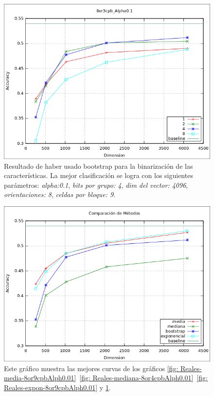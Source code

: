 			\begin{figure}[htbp]
				\centering
				\includegraphics[scale=0.6]{img/resultados/reales/bootstrap_8or3cpb_Alpha0,1.png}
				\caption[Reales con umbral boostrap]{Resultado de haber usado bootstrap para la binarización de las características. La mejor clasificación se logra con los siguientes parámetros: \textit{alpha:0.1}, \textit{bits por grupo: 4}, \textit{dim del vector: 4096}, \textit{orientaciones: 8}, \textit{celdas por bloque: 9}.}
				\label{fig: Reales-bootstrap-8or9cpbAlph0.1}
			\end{figure}
			
			\begin{figure}[htbp]
				\centering
				\includegraphics[scale=0.6]{img/resultados/reales/comparativa_metodos.png}
				\caption[Reales - Comparación entre métodos]{Este gráfico muestra las mejores curvas de los gráficos \ref{fig: Reales-media-8or9cpbAlph0.01}~\ref{fig: Reales-mediana-8or4cpbAlph0.01}~\ref{fig: Reales-expon-8or9cpbAlph0.01} y \ref{fig: Reales-bootstrap-8or9cpbAlph0.1}.}
				\label{fig: Reales-Comparativa metodos}
			\end{figure}

